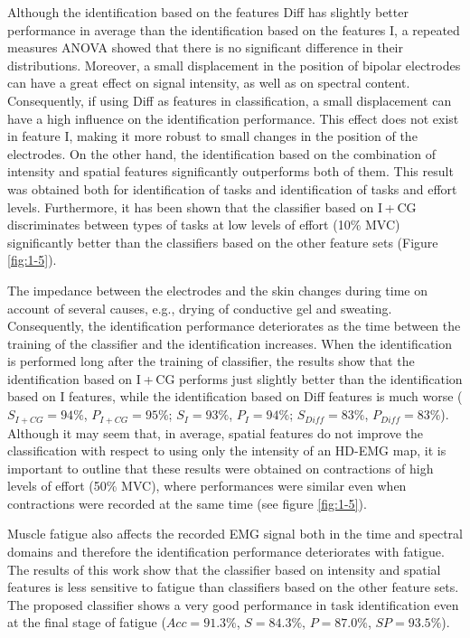 Although the identification based on the features Diff has slightly better performance in average than the identification based on the features I, a repeated measures ANOVA showed that there is no significant difference in their distributions. Moreover, a small displacement in the position of bipolar electrodes can have a great effect on signal intensity, as well as on spectral content. Consequently, if using Diff as features in classification, a small displacement can have a high influence on the identification performance. This effect does not exist in feature I, making it more robust to small changes in the position of the electrodes. On the other hand, the identification based on the combination of intensity and spatial features significantly outperforms both of them. This result was obtained both for identification of tasks and identification of tasks and effort levels. Furthermore, it has been shown that the classifier based on I + CG discriminates between types of tasks at low levels of effort (10\% MVC) significantly better than the classifiers based on the other feature sets (Figure \ref{fig:1-5}).

The impedance between the electrodes and the skin changes during time on account of several causes, e.g., drying of conductive gel and sweating. Consequently, the identification performance deteriorates as the time between the training of the classifier and the identification increases. When the identification is performed long after the training of classifier, the results show that the identification based on I + CG performs just slightly better than the identification based on I features, while the identification based on Diff features is much worse ($S_{I+CG} = 94\%$, $P_{I+CG} = 95\%$; $S_I = 93\%$, $P_I = 94\%$; $S_{Diff} = 83\%$, $P_{Diff} = 83\%$). Although it may seem that, in average, spatial features do not improve the classification with respect to using only the intensity of an HD-EMG map, it is important to outline that these results were obtained on contractions of high levels of effort (50\% MVC), where performances were similar even when contractions were recorded at the same time (see figure \ref{fig:1-5}).

Muscle fatigue also affects the recorded EMG signal both in the time and spectral domains and therefore the identification performance deteriorates with fatigue. The results of this work show that the classifier based on intensity and spatial features is less sensitive to fatigue than classifiers based on the other feature sets. The proposed classifier shows a very good performance in task identification even at the final stage of fatigue ($Acc = 91.3\%$, $S = 84.3\%$, $P = 87.0\%$, $SP = 93.5\%$).

